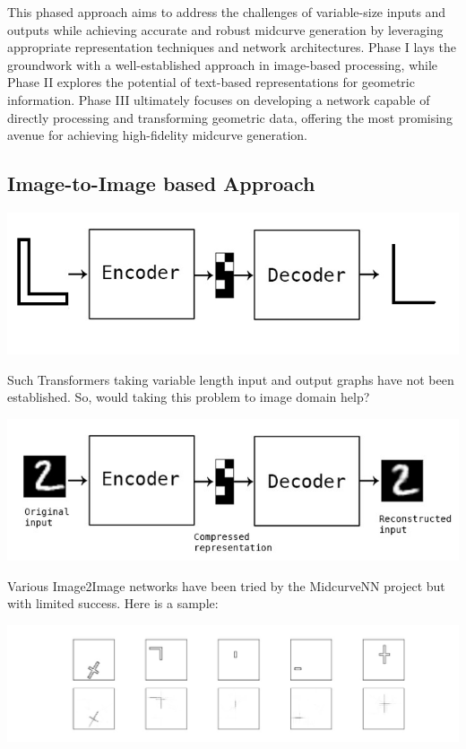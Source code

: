 \documentclass[conference]{IEEEtran}
\begin{document}
This phased approach aims to address the challenges of variable-size inputs and outputs while achieving accurate and robust midcurve generation by leveraging appropriate representation techniques and network architectures. Phase I lays the groundwork with a well-established approach in image-based processing, while Phase II explores the potential of text-based representations for geometric information. Phase III ultimately focuses on developing a network capable of directly processing and transforming geometric data, offering the most promising avenue for achieving high-fidelity midcurve generation.

\subsection{Image-to-Image based Approach}
\label{subsec:6}

     \begin{center}
	\includegraphics[width=0.8\linewidth]{images/midcurve26}
	 \cite{midcurvenn2022}
	\label{fig_ecd}
    \end{center}

Such Transformers taking variable length input and output graphs have not been established. So, would taking this problem to image domain help?

     \begin{center}
	\includegraphics[width=0.8\linewidth]{images/midcurve25}
	 \cite{autoenkeras}
	\label{fig_ecd}
    \end{center}
    
    Various Image2Image networks have been tried by the MidcurveNN project but with limited success. Here is a sample:
    
         \begin{center}
	\includegraphics[width=0.8\linewidth]{images/midcurvenn_simpleencoderdecoder}
	 \cite{midcurvenngithub}
	\label{fig_ecd}
    \end{center}
    
\end{document}
